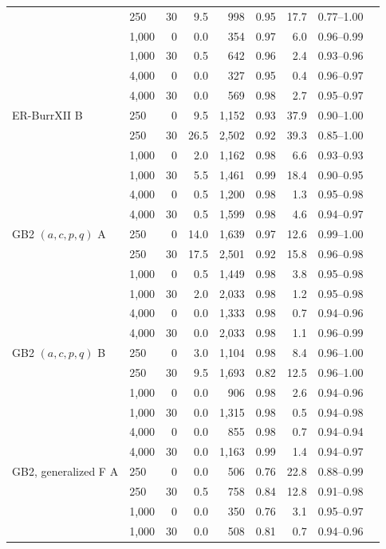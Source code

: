 {\begin{longtable}{llrrrrrrr}
 & 250 & 30 & 9.5 & 998 & 0.95 & 17.7 & 0.77--1.00 \\
 & 1,000 & 0 & 0.0 & 354 & 0.97 & 6.0 & 0.96--0.99 \\
 & 1,000 & 30 & 0.5 & 642 & 0.96 & 2.4 & 0.93--0.96 \\
 & 4,000 & 0 & 0.0 & 327 & 0.95 & 0.4 & 0.96--0.97 \\
 & 4,000 & 30 & 0.0 & 569 & 0.98 & 2.7 & 0.95--0.97 \\
ER-BurrXII B & 250 & 0 & 9.5 & 1,152 & 0.93 & 37.9 & 0.90--1.00 \\
 & 250 & 30 & 26.5 & 2,502 & 0.92 & 39.3 & 0.85--1.00 \\
 & 1,000 & 0 & 2.0 & 1,162 & 0.98 & 6.6 & 0.93--0.93 \\
 & 1,000 & 30 & 5.5 & 1,461 & 0.99 & 18.4 & 0.90--0.95 \\
 & 4,000 & 0 & 0.5 & 1,200 & 0.98 & 1.3 & 0.95--0.98 \\
 & 4,000 & 30 & 0.5 & 1,599 & 0.98 & 4.6 & 0.94--0.97 \\
GB2 $(a,c,p,q)$ A & 250 & 0 & 14.0 & 1,639 & 0.97 & 12.6 & 0.99--1.00 \\
 & 250 & 30 & 17.5 & 2,501 & 0.92 & 15.8 & 0.96--0.98 \\
 & 1,000 & 0 & 0.5 & 1,449 & 0.98 & 3.8 & 0.95--0.98 \\
 & 1,000 & 30 & 2.0 & 2,033 & 0.98 & 1.2 & 0.95--0.98 \\
 & 4,000 & 0 & 0.0 & 1,333 & 0.98 & 0.7 & 0.94--0.96 \\
 & 4,000 & 30 & 0.0 & 2,033 & 0.98 & 1.1 & 0.96--0.99 \\
GB2 $(a,c,p,q)$ B & 250 & 0 & 3.0 & 1,104 & 0.98 & 8.4 & 0.96--1.00 \\
 & 250 & 30 & 9.5 & 1,693 & 0.82 & 12.5 & 0.96--1.00 \\
 & 1,000 & 0 & 0.0 & 906 & 0.98 & 2.6 & 0.94--0.96 \\
 & 1,000 & 30 & 0.0 & 1,315 & 0.98 & 0.5 & 0.94--0.98 \\
 & 4,000 & 0 & 0.0 & 855 & 0.98 & 0.7 & 0.94--0.94 \\
 & 4,000 & 30 & 0.0 & 1,163 & 0.99 & 1.4 & 0.94--0.97 \\
GB2, generalized F A & 250 & 0 & 0.0 & 506 & 0.76 & 22.8 & 0.88--0.99 \\
 & 250 & 30 & 0.5 & 758 & 0.84 & 12.8 & 0.91--0.98 \\
 & 1,000 & 0 & 0.0 & 350 & 0.76 & 3.1 & 0.95--0.97 \\
 & 1,000 & 30 & 0.0 & 508 & 0.81 & 0.7 & 0.94--0.96 \\

\end{longtable}}
